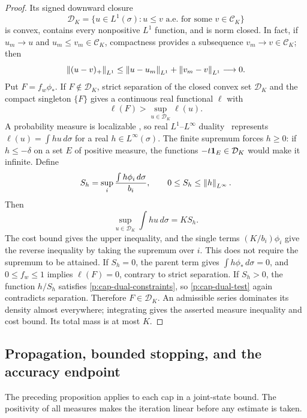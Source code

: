 \begin{proof}
Its signed downward closure
\[
 \mathcal D_K=\{u\in L^1(\sigma):u\le v\text{ a.e. for some }v\in\mathcal C_K\}
\]
is convex, contains every nonpositive $L^1$ function, and is norm closed.
In fact, if $u_m\to u$ and $u_m\le v_m\in\mathcal C_K$, compactness
provides a subsequence $v_m\to v\in\mathcal C_K$; then
\[
 \left\lVert (u-v)_+\right\rVert_{L^1}
 \le\left\lVert u-u_m\right\rVert_{L^1}+\left\lVert v_m-v\right\rVert_{L^1}\longrightarrow0.
\]
Put $F=f_w\phi_*$. If $F\notin\mathcal D_K$, strict separation of the
closed convex set $\mathcal D_K$ and the compact singleton $\{F\}$
\cite[Section~5.2, Theorem~5.20(b), pp.~98--99]{SchnaubeltFA2025}
gives a continuous real functional $\ell$ with
\[
 \ell(F)>\sup_{u\in\mathcal D_K}\ell(u).
\]
A probability measure is localizable
\cite[Theorem~211L]{FremlinTaxonomy}, so real $L^1$--$L^\infty$
duality~\cite[Theorem~243G(b)]{FremlinFunctionSpaces} represents
$\ell(u)=\int hu\,d\sigma$ for a real $h\in L^\infty(\sigma)$.
The finite supremum forces $h\ge0$: if $h\le-\delta$ on a set $E$
of positive measure, the functions $-t\mathbf 1_E\in\mathcal D_K$ would make
it infinite. Define
\[
 S_h=\sup_i\frac{\int h\phi_i\,d\sigma}{b_i},\qquad
 0\le S_h\le\left\lVert h\right\rVert_{L^\infty}.
\]
Then
\begin{equation}\label{p:cap-support-functional}
 \sup_{u\in\mathcal D_K}\int hu\,d\sigma=KS_h.
\end{equation}
The cost bound gives the upper inequality, and the single terms
$(K/b_i)\phi_i$ give the reverse inequality by taking the supremum over
$i$. This does not require the supremum to be attained. If $S_h=0$,
the parent term gives $\int h\phi_*\,d\sigma=0$, and $0\le f_w\le1$
implies $\ell(F)=0$, contrary to strict separation. If $S_h>0$, the
function $h/S_h$ satisfies \eqref{p:cap-dual-constraints}, so
\eqref{p:cap-dual-test} again contradicts separation. Therefore
$F\in\mathcal D_K$. An admissible series dominates its density almost
everywhere; integrating gives the asserted measure inequality and cost
bound. Its total mass is at most $K$.
\end{proof}

\subsection{Propagation, bounded stopping, and the accuracy endpoint}

The preceding proposition applies to each cap in a joint-state bound.
The positivity of all measures makes the iteration linear before any
estimate is taken.

